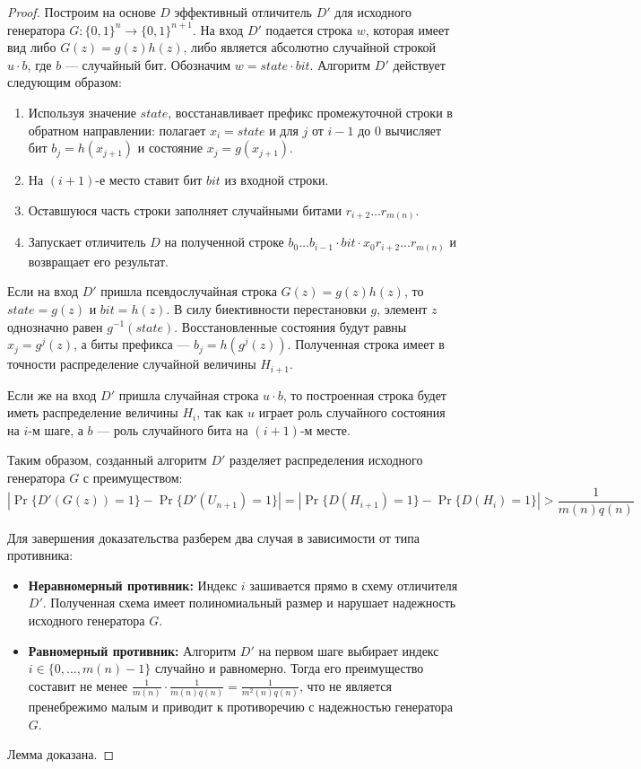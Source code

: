 \begin{proof}
    Построим на основе $D$ эффективный отличитель $D'$ для исходного генератора $G: \{0,1\}^n \to \{0,1\}^{n+1}$. На вход $D'$ подается строка $w$, которая имеет вид либо $G(z) = g(z)h(z)$, либо является абсолютно случайной строкой $u \cdot b$, где $b$ — случайный бит. Обозначим $w = state \cdot bit$. Алгоритм $D'$ действует следующим образом:
    \begin{enumerate}
        \item Используя значение $state$, восстанавливает префикс промежуточной строки в обратном направлении: полагает $x_i = state$ и для $j$ от $i-1$ до $0$ вычисляет бит $b_j = h(x_{j+1})$ и состояние $x_j = g(x_{j+1})$.
        \item На $(i+1)$-е место ставит бит $bit$ из входной строки.
        \item Оставшуюся часть строки заполняет случайными битами $r_{i+2} \dots r_{m(n)}$.
        \item Запускает отличитель $D$ на полученной строке $b_0 \dots b_{i-1} \cdot bit \cdot x_0 r_{i+2} \dots r_{m(n)}$ и возвращает его результат.
    \end{enumerate}

    Если на вход $D'$ пришла псевдослучайная строка $G(z) = g(z)h(z)$, то $state = g(z)$ и $bit = h(z)$. В силу биективности перестановки $g$, элемент $z$ однозначно равен $g^{-1}(state)$. Восстановленные состояния будут равны $x_j = g^j(z)$, а биты префикса — $b_j = h(g^j(z))$. Полученная строка имеет в точности распределение случайной величины $H_{i+1}$.

    Если же на вход $D'$ пришла случайная строка $u \cdot b$, то построенная строка будет иметь распределение величины $H_i$, так как $u$ играет роль случайного состояния на $i$-м шаге, а $b$ — роль случайного бита на $(i+1)$-м месте.

    Таким образом, созданный алгоритм $D'$ разделяет распределения исходного генератора $G$ с преимуществом:
    \[ \left| \Pr\{D'(G(z)) = 1\} - \Pr\{D'(U_{n+1}) = 1\} \right| = \left| \Pr\{D(H_{i+1}) = 1\} - \Pr\{D(H_i) = 1\} \right| > \frac{1}{m(n)q(n)} \]
    
    Для завершения доказательства разберем два случая в зависимости от типа противника:
    \begin{itemize}
        \item \textbf{Неравномерный противник:} Индекс $i$ зашивается прямо в схему отличителя $D'$. Полученная схема имеет полиномиальный размер и нарушает надежность исходного генератора $G$.
        \item \textbf{Равномерный противник:} Алгоритм $D'$ на первом шаге выбирает индекс $i \in \{0, \dots, m(n)-1\}$ случайно и равномерно. Тогда его преимущество составит не менее $\frac{1}{m(n)} \cdot \frac{1}{m(n)q(n)} = \frac{1}{m^2(n)q(n)}$, что не является пренебрежимо малым и приводит к противоречию с надежностью генератора $G$.
    \end{itemize}
    Лемма доказана.
\end{proof}

